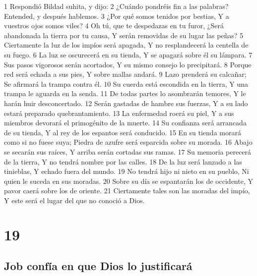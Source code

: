 1 Respondió Bildad suhita, y dijo:
2 ¿Cuándo pondréis fin a las palabras?
Entended, y después hablemos.
3 ¿Por qué somos tenidos por bestias,
Y a vuestros ojos somos viles?
4 Oh tú, que te despedazas en tu furor,
¿Será abandonada la tierra por tu causa,
Y serán removidas de su lugar las peñas? 
5 Ciertamente la luz de los impíos será apagada,
Y no resplandecerá la centella de su fuego.
6 La luz se oscurecerá en su tienda,
Y se apagará sobre él su lámpara.
7 Sus pasos vigorosos serán acortados,
Y su mismo consejo lo precipitará.
8 Porque red será echada a sus pies,
Y sobre mallas andará.
9 Lazo prenderá su calcañar;
Se afirmará la trampa contra él.
10 Su cuerda está escondida en la tierra,
Y una trampa le aguarda en la senda.
11 De todas partes lo asombrarán temores,
Y le harán huir desconcertado.
12 Serán gastadas de hambre sus fuerzas,
Y a su lado estará preparado quebrantamiento.
13 La enfermedad roerá su piel,
Y a sus miembros devorará el primogénito de la muerte.
14 Su confianza será arrancada de su tienda,
Y al rey de los espantos será conducido.
15 En su tienda morará como si no fuese suya;
Piedra de azufre será esparcida sobre su morada.
16 Abajo se secarán sus raíces,
Y arriba serán cortadas sus ramas.
17 Su memoria perecerá de la tierra,
Y no tendrá nombre por las calles.
18 De la luz será lanzado a las tinieblas,
Y echado fuera del mundo.
19 No tendrá hijo ni nieto en su pueblo,
Ni quien le suceda en sus moradas.
20 Sobre su día se espantarán los de occidente,
Y pavor caerá sobre los de oriente.
21 Ciertamente tales son las moradas del impío,
Y este será el lugar del que no conoció a Dios.

\chapter{19}

\section*{Job confía en que Dios lo justificará}

